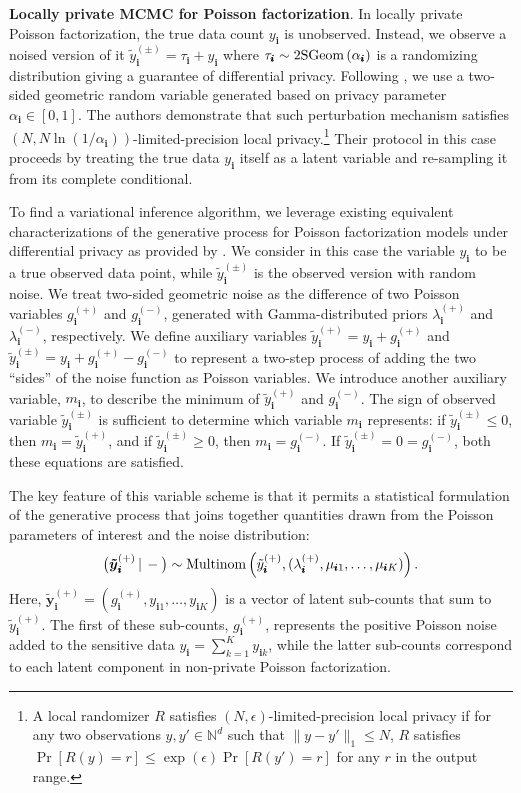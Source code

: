\documentclass{article}
\newcommand{\subs}{\pmb{i}}
\newcommand{\wsup}[2]{#1_{\subs}^{(#2)}}
\newcommand{\ytP}{\wsup{\tilde{y}}{+}}
\newcommand{\ytPM}{\wsup{\tilde{y}}{\pm}}
\newcommand{\ysk}{y_{\subs k}}
\newcommand{\ys}{y_{\subs}}
\newcommand{\taus}{\tau_{\subs}}
\newcommand{\lamP}{\wsup{\lambda}{+}}
\newcommand{\lamM}{\wsup{\lambda}{-}}
\newcommand{\gP}{\wsup{g}{+}}
\newcommand{\gM}{\wsup{g}{-}}
\newcommand{\ms}{m_{\subs}}
\newcommand{\yvtP}{\boldsymbol{\tilde{y}}_{\subs}^{(+)}}
\newcommand{\Multi}[1]{\textup{Multinom}\left( #1 \right)}
\newcommand{\Geo}[1]{\textup{2SGeom}\left( #1 \right)}
\newcommand{\given}{\,|\,}
\newcommand{\compcond}[1]{\big(#1\given-\big)}
\begin{document}
  \textbf{Locally private MCMC for Poisson factorization}. In locally private
  Poisson factorization, the true data count $\ys$ is unobserved. Instead, we
  observe a noised version of it $\ytPM = \taus + \ys$ where $\taus \sim
  \Geo{\alpha_{\subs}}$ is a randomizing distribution giving a guarantee of
  differential privacy. Following \cite{schein2018locally}, we use a two-sided
  geometric random variable generated based on privacy parameter $\alpha_{\subs} \in [0,1]$.
  The authors demonstrate that such perturbation mechanism satisfies $(N, N
  \ln(1/\alpha_{\subs}))$-limited-precision local privacy.\footnote{A local
  randomizer $R$ satisfies $(N, \epsilon)$-limited-precision local privacy if
  for any two observations $y,y'\in \mathbb{N}^d$ such that $\|y-y'\|_1\leq N$,
  $R$ satisfies $\Pr[R(y) = r] \leq \exp(\epsilon)\Pr[R(y') = r]$ for any $r$ in
  the output range.} Their protocol in this case proceeds by treating the true data $\ys$
  itself as a latent variable and re-sampling it from its complete conditional.

  To find a variational inference algorithm, we leverage existing equivalent
  characterizations of the generative process for Poisson factorization models
  under differential privacy as provided by \citep{schein2018locally}. We
  consider in this case the variable $\ys$ to be a true observed data point,
  while $\ytPM$ is the observed version with random noise. We treat two-sided
  geometric noise as the difference of two Poisson variables $\gP$ and $\gM$,
  generated with Gamma-distributed priors $\lamP$ and $\lamM$, respectively. We
  define auxiliary variables $\ytP = \ys + \gP$ and $\ytPM = \ys + \gP - \gM$ to
  represent a two-step process of adding the two ``sides'' of the noise function
  as Poisson variables. We introduce another auxiliary variable, $\ms$, to
  describe the minimum of $\ytP$ and $\gM$. The sign of observed variable
  $\ytPM$ is sufficient to determine which variable $\ms$ represents: if $\ytPM
  \leq 0$, then $\ms = \ytP$, and if $\ytPM \geq 0$, then $\ms = \gM$. If $\ytPM
  = 0 = \gM$, both these equations are satisfied.

  The key feature of this variable scheme is that it permits a statistical
  formulation of the generative process that joins together quantities drawn from
  the Poisson parameters of interest and the noise
  distribution:
  \begin{equation}
    \compcond{\yvtP} \sim \Multi{\ytP, (\lamP, \mu_{\subs 1}, \dots, \mu_{\subs K})}.
  \end{equation} 
  Here, $\yvtP=(\gP, y_{\subs 1}, \dots, y_{\subs K})$ is a vector of latent
  sub-counts that sum to $\ytP$. The first of these sub-counts, $\gP$, represents
  the positive Poisson noise added to the sensitive data $\ys=\sum_{k=1}^K \ysk$,
  while the latter sub-counts correspond to each latent component in non-private
  Poisson factorization.
\end{document}

